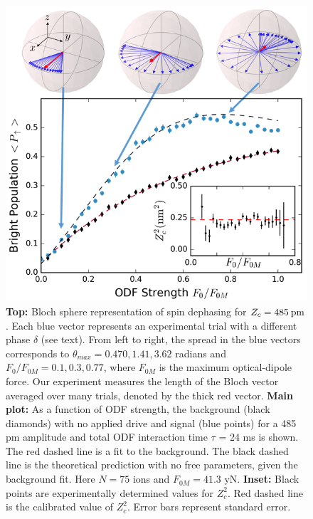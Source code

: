 \documentclass[aps,prl,twocolumn,superscriptaddress,floatfix]{revtex4-1}
\begin{document}
\begin{figure}
    \centering
    \includegraphics[width=\columnwidth]{odf_strength_bloch}
  \caption{\textbf{Top:} Bloch sphere representation  of spin dephasing for $Z_{c} = 485\: \rm{pm}$. Each blue vector represents an experimental trial with a different phase $\delta$ (see text). From left to right, the spread in the blue vectors corresponds to $\theta_{max} = 0.470, 1.41, 3.62$ radians and $F_{0}/F_{0M} = 0.1,0.3,0.77$, where $F_{0M}$ is the maximum optical-dipole force. Our experiment measures the length of the Bloch vector averaged over many trials, denoted by the thick red vector. \textbf{Main plot:} As a function of ODF strength, the background (black diamonds) with no applied drive and signal (blue points) for a 485 pm amplitude and total ODF interaction time $\tau$ = 24 ms is shown. The red dashed line is a fit to the background. The black dashed line is the theoretical prediction with no free parameters, given the background fit. Here $N = 75$ ions and $F_{0M} = 41.3$ yN. \textbf{Inset:} Black points are experimentally determined values for $Z_{c}^2$. Red dashed line is the calibrated value of $Z_{c}^{2}$. Error bars represent standard error.}\label{Meas_stren}
\end{figure}
\end{document}
